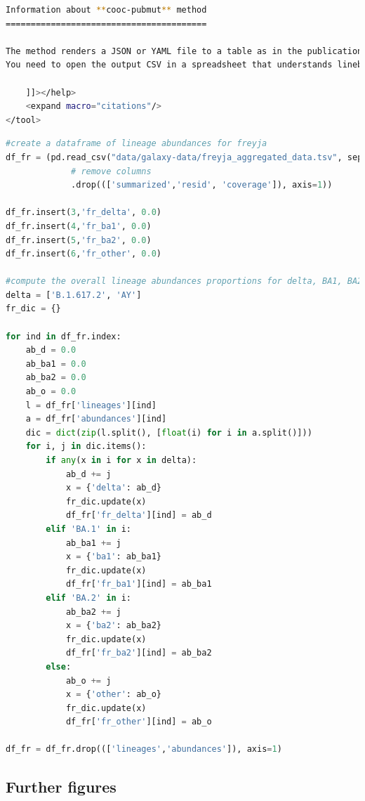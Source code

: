 \begin{lstlisting}[language=bash, caption=tool wrapper for Cojac: pubmut, label=list:methods:wrapper-cojac-pubmut]
Information about **cooc-pubmut** method
========================================

The method renders a JSON or YAML file to a table as in the publication.
You need to open the output CSV in a spreadsheet that understands linebreaks.

    ]]></help>
    <expand macro="citations"/>
</tool>
\end{lstlisting}







\begin{lstlisting}[language=python, caption=python script to compute the overall lineage abundances proportions of considered lineages in mock dataset for Freyja output, label=list:methods:freyja-vocs-abundances]
#create a dataframe of lineage abundances for freyja
df_fr = (pd.read_csv("data/galaxy-data/freyja_aggregated_data.tsv", sep='\t')
             # remove columns
             .drop((['summarized','resid', 'coverage']), axis=1))
            
df_fr.insert(3,'fr_delta', 0.0)
df_fr.insert(4,'fr_ba1', 0.0)
df_fr.insert(5,'fr_ba2', 0.0)
df_fr.insert(6,'fr_other', 0.0)

#compute the overall lineage abundances proportions for delta, BA1, BA2, and other for Freyja output
delta = ['B.1.617.2', 'AY']
fr_dic = {}

for ind in df_fr.index:
    ab_d = 0.0
    ab_ba1 = 0.0
    ab_ba2 = 0.0
    ab_o = 0.0
    l = df_fr['lineages'][ind]
    a = df_fr['abundances'][ind]
    dic = dict(zip(l.split(), [float(i) for i in a.split()]))
    for i, j in dic.items():
        if any(x in i for x in delta):
            ab_d += j
            x = {'delta': ab_d}
            fr_dic.update(x)
            df_fr['fr_delta'][ind] = ab_d
        elif 'BA.1' in i:
            ab_ba1 += j
            x = {'ba1': ab_ba1}
            fr_dic.update(x)
            df_fr['fr_ba1'][ind] = ab_ba1
        elif 'BA.2' in i:
            ab_ba2 += j
            x = {'ba2': ab_ba2}
            fr_dic.update(x)
            df_fr['fr_ba2'][ind] = ab_ba2
        else:
            ab_o += j
            x = {'other': ab_o}
            fr_dic.update(x)
            df_fr['fr_other'][ind] = ab_o
        
df_fr = df_fr.drop((['lineages','abundances']), axis=1)
\end{lstlisting}
    \subsection{Further figures}
